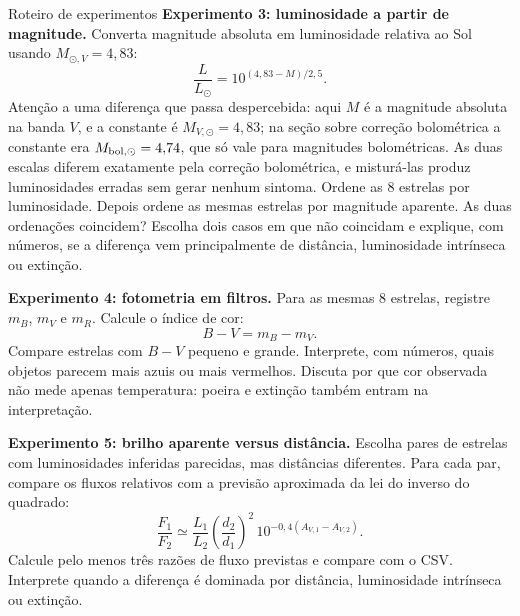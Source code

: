 \documentclass[11pt,a4paper]{article}
\begin{document}
\begin{lessonblock}[borderline west={2pt}{0pt}{astroGold}]{Roteiro de experimentos}
\textbf{Experimento 3: luminosidade a partir de magnitude.}
Converta magnitude absoluta em luminosidade relativa ao Sol usando $M_{\odot,V}=4{,}83$:
\[
\frac{L}{L_\odot}=10^{(4{,}83-M)/2{,}5}.
\]
Atenção a uma diferença que passa despercebida: aqui $M$ é a magnitude absoluta na banda $V$, e a constante é $M_{V,\odot}=4{,}83$; na seção sobre correção bolométrica a constante era $M_{{\rm bol},\odot}=4{,}74$, que só vale para magnitudes bolométricas. As duas escalas diferem exatamente pela correção bolométrica, e misturá-las produz luminosidades erradas sem gerar nenhum sintoma.
Ordene as 8 estrelas por luminosidade. Depois ordene as mesmas estrelas por magnitude aparente. As duas ordenações coincidem? Escolha dois casos em que não coincidam e explique, com números, se a diferença vem principalmente de distância, luminosidade intrínseca ou extinção.

\textbf{Experimento 4: fotometria em filtros.}
Para as mesmas 8 estrelas, registre $m_B$, $m_V$ e $m_R$. Calcule o índice de cor:
\[
B-V=m_B-m_V.
\]
Compare estrelas com $B-V$ pequeno e grande. Interprete, com números, quais objetos parecem mais azuis ou mais vermelhos. Discuta por que cor observada não mede apenas temperatura: poeira e extinção também entram na interpretação.

\textbf{Experimento 5: brilho aparente versus distância.}
Escolha pares de estrelas com luminosidades inferidas parecidas, mas distâncias diferentes. Para cada par, compare os fluxos relativos com a previsão aproximada da lei do inverso do quadrado:
\[
\frac{F_1}{F_2}\simeq\frac{L_1}{L_2}\left(\frac{d_2}{d_1}\right)^2\,10^{-0{,}4(A_{V,1}-A_{V,2})}.
\]
Calcule pelo menos três razões de fluxo previstas e compare com o CSV. Interprete quando a diferença é dominada por distância, luminosidade intrínseca ou extinção.
\end{lessonblock}
\end{document}
